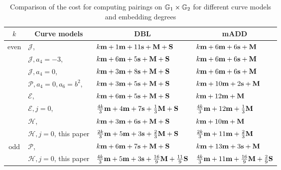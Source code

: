 \begin{table}[h]
\centering
\caption{Comparison of the cost for computing pairings on $\mathbb{G}_{1} \times \mathbb{G}_{2}$ for different curve models and embedding degrees}

\begin{tabular}{ l | l | l | l}
\hline
\multicolumn{1}{c|}{$k$}
&\multicolumn{1}{c|}{Curve models}	&\multicolumn{1}{c|}{DBL}	&\multicolumn{1}{c}{mADD}	\\
\hline
\multicolumn{1}{c|}{\multirow{6}{*}{even}}
&$\mathcal{J}$, \cite{2008/IonicaJoux08} \cite{2009/fastertate}
				&$k\textbf{m} + 1\textbf{m} + 11\textbf{s} + \textbf{M} + \textbf{S}$	&$k\textbf{m} + 6\textbf{m} + 6\textbf{s} + \textbf{M} $	\\
&$\mathcal{J},a_4 = -3$, \cite{2009/fastertate}
				&$k\textbf{m} + 6\textbf{m} + 5\textbf{s} + \textbf{M} + \textbf{S}$		&$k\textbf{m} + 6\textbf{m} + 6\textbf{s} + \textbf{M}$	\\
&$\mathcal{J},a_4 = 0$, \cite{2009/fastertate}		
				&$k\textbf{m} + 3\textbf{m} + 8\textbf{s} + \textbf{M} + \textbf{S}$		&$k\textbf{m} + 6\textbf{m} + 6\textbf{s} + \textbf{M}$	\\
&$\mathcal{P},a_4 = 0, a_6 = b^2$, \cite{2009/craig}
				&$k\textbf{m} + 3\textbf{m} + 5\textbf{s} + \textbf{M} + \textbf{S}$		&$k\textbf{m} + 10\textbf{m} + 2\textbf{s} + \textbf{M}$	\\
&$\mathcal{E}$, \cite{2009/fastertate}			
				&$k\textbf{m} + 6\textbf{m} + 5\textbf{s} + \textbf{M} + \textbf{S}$		&$k\textbf{m} + 12\textbf{m} + \textbf{M}$	\\
&$\mathcal{E},j=0$, \cite{2012/LWZ}
				&$\frac{4k}{3}\textbf{m} + 4\textbf{m} + 7\textbf{s}  + \frac{1}{3}\textbf{M} + \textbf{S}$
				&$\frac{4k}{3}\textbf{m} + 12\textbf{m}  + \frac{1}{3}\textbf{M}$ \\
&$\mathcal{H}$, \cite{2010/Gu}	&$k\textbf{m} + 3\textbf{m} + 6\textbf{s} + \textbf{M} + \textbf{S}$ &$k\textbf{m} + 10\textbf{m} + \textbf{M}$	\\
&$\mathcal{H},j=0$, this paper 	&
$ \frac{2k}{3}\textbf{m} + 5\textbf{m} + 3\textbf{s} + \frac{2}{3}\textbf{M} + \textbf{S}$		&
$ \frac{2k}{3}\textbf{m} + 11\textbf{m} + \frac{2}{3}\textbf{M}$	\\
\hline
\multicolumn{1}{c|}{\multirow{2}{*}{odd}}
&$\mathcal{P}$, \cite{2010/CLN}	&$k\textbf{m} + 6\textbf{m} + 7\textbf{s} + \textbf{M} + \textbf{S}$		&$k\textbf{m} + 13\textbf{m} + 3\textbf{s} + \textbf{M}$	\\
&$\mathcal{H},j=0$, this paper
&$ \frac{4k}{3}\textbf{m} + 5\textbf{m} + 3\textbf{s} + \frac{16}{9}\textbf{M} + \frac{11}{9}\textbf{S}$
&$\frac{4k}{3}\textbf{m} + 11\textbf{m} + \frac{16}{9}\textbf{M} + \frac{2}{9}\textbf{S} $	\\
\hline
\end{tabular}
\label{tbl-cmp1}


\end{table}

